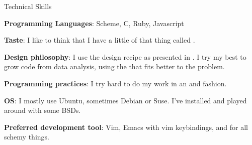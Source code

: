 \begin{rubric}{Technical Skills}{ 

    \entry* \textbf{Programming Languages}: Scheme, C, Ruby, Javascript

    \entry* \textbf{Taste}: I like to think that I have a little of that thing
    called .

    \entry* \textbf{Design philosophy}: I use the design recipe as presented in
    . I try my best to grow code
    from data analysis, using the
    that fits better to the problem.

    \entry* \textbf{Programming practices}: I try hard to do my work in an
    and
    fashion.

    \entry* \textbf{OS}: I mostly use Ubuntu, sometimes Debian or Suse. I've
    installed and played around with some BSDs.

    \entry* \textbf{Preferred development tool}: Vim, Emacs with vim
    keybindings, and 
    for all schemy things. 

}\end{rubric}
